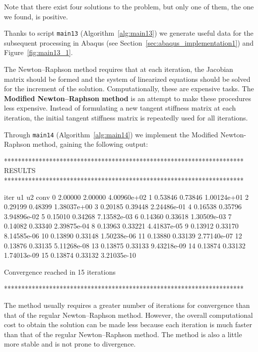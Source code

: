 Note that there exist four solutions to the problem, but only one of them, the one we found, is positive.

\newpage

Thanks to script \texttt{main13} (Algorithm~\ref{alg:main13}) we generate useful data for the subsequent processing in Abaqus (see Section~\ref{sec:abaqus_implementation1}) and Figure~\ref{fig:main13_1}.

\vspace{5mm}

The Newton–Raphson method requires that at each iteration, the Jacobian matrix should be formed and the system of linearized equations should be solved for the increment of the solution. Computationally, these are expensive tasks. The \textbf{Modified Newton–Raphson method} is an attempt to make these procedures less expensive. Instead of formulating a new tangent stiffness matrix at each iteration, the initial tangent stiffness matrix is repeatedly used for all iterations. 

Through \texttt{main14} (Algorithm~\ref{alg:main14}) we implement the Modified Newton-Raphson method, gaining the following output:
\begin{matlaboutput}
*********************************************************************
RESULTS
*********************************************************************

iter   u1        u2        conv
   0   2.00000   2.00000   4.00960e+02
   1   0.53846   0.73846   1.00124e+01
   2   0.29199   0.48399   1.38037e+00
   3   0.20185   0.39448   2.24486e-01
   4   0.16538   0.35796   3.94896e-02
   5   0.15010   0.34268   7.13582e-03
   6   0.14360   0.33618   1.30509e-03
   7   0.14082   0.33340   2.39875e-04
   8   0.13963   0.33221   4.41837e-05
   9   0.13912   0.33170   8.14585e-06
  10   0.13890   0.33148   1.50238e-06
  11   0.13880   0.33139   2.77140e-07
  12   0.13876   0.33135   5.11268e-08
  13   0.13875   0.33133   9.43218e-09
  14   0.13874   0.33132   1.74013e-09
  15   0.13874   0.33132   3.21035e-10

Convergence reached in 15 iterations

*********************************************************************
\end{matlaboutput}

The method usually requires a greater number of iterations for convergence than that of the regular Newton–Raphson method. However, the overall computational cost to obtain the solution can be made less because each iteration is much faster than that of the regular Newton–Raphson method. The method is also a little more stable and is not prone to divergence.

